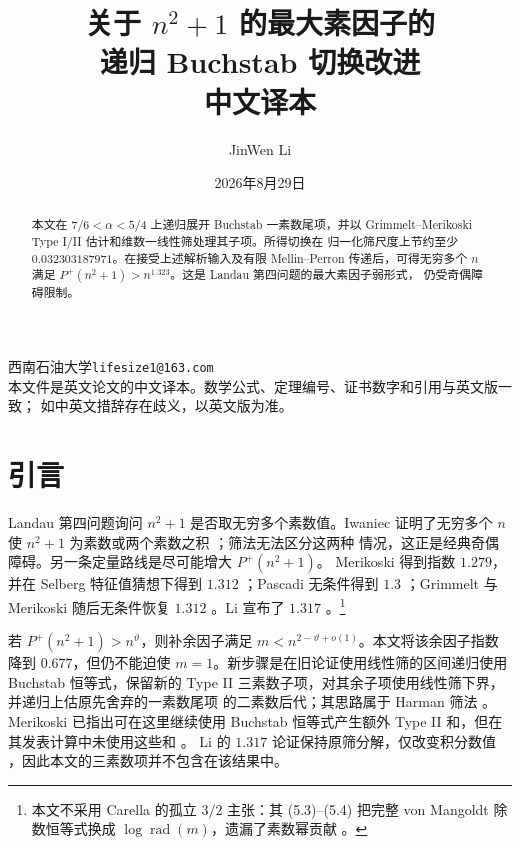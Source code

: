 \documentclass[UTF8,10pt,a4paper]{ctexart}
\title{关于 $n^2+1$ 的最大素因子的\\递归 Buchstab 切换改进\\
\large 中文译本}
\author{JinWen Li}
\date{2026年8月29日}
\newcommand{\Pplus}{P^{+}}
\newcommand{\1}{\mathbf{1}}
\theoremstyle{remark}
\begin{document}
\maketitle

\begin{center}
\small
西南石油大学\quad\texttt{lifesize1@163.com}\\[4pt]
本文件是英文论文的中文译本。数学公式、定理编号、证书数字和引用与英文版一致；
如中英文措辞存在歧义，以英文版为准。
\end{center}

\begin{abstract}
本文在 $7/6<\alpha<5/4$ 上递归展开 Buchstab 一素数尾项，并以
Grimmelt--Merikoski Type I/II 估计和维数一线性筛处理其子项。所得切换在
归一化筛尺度上节约至少 $0.032303187971$。在接受上述解析输入及有限
Mellin--Perron 传递后，可得无穷多个 $n$ 满足
$\Pplus(n^2+1)>n^{1.323}$。这是 Landau 第四问题的最大素因子弱形式，
仍受奇偶障碍限制。
\end{abstract}


\section{引言}

Landau 第四问题询问 $n^2+1$ 是否取无穷多个素数值。Iwaniec 证明了无穷多个
$n$ 使 $n^2+1$ 为素数或两个素数之积 \cite{Iwaniec1978}；筛法无法区分这两种
情况，这正是经典奇偶障碍。另一条定量路线是尽可能增大 $\Pplus(n^2+1)$。
Merikoski 得到指数 $1.279$，并在 Selberg 特征值猜想下得到 $1.312$
\cite{Merikoski2020}；Pascadi 无条件得到 $1.3$ \cite{Pascadi2026}；Grimmelt 与
Merikoski 随后无条件恢复 $1.312$ \cite{GrimmeltMerikoski2025}。Li 宣布了
$1.317$ \cite{Li2025}。\footnote{本文不采用 Carella 的孤立 $3/2$ 主张：其
(5.3)--(5.4) 把完整 von Mangoldt 除数恒等式换成
$\log\operatorname{rad}(m)$，遗漏了素数幂贡献 \cite[Section 5]{Carella2025}。}

若 $\Pplus(n^2+1)>n^\vartheta$，则补余因子满足
$m<n^{2-\vartheta+o(1)}$。本文将该余因子指数降到 $0.677$，但仍不能迫使
$m=1$。新步骤是在旧论证使用线性筛的区间递归使用 Buchstab 恒等式，保留新的
Type II 三素数子项，对其余子项使用线性筛下界，并递归上估原先舍弃的一素数尾项
的二素数后代；其思路属于 Harman 筛法 \cite{Harman2007}。Merikoski 已指出可在这里继续使用 Buchstab 恒等式产生额外
Type II 和，但在其发表计算中未使用这些和 \cite[Remark 12]{Merikoski2020}。
Li 的 $1.317$ 论证保持原筛分解，仅改变积分数值
\cite[Lemmas 2.1 and 2.2]{Li2025}，因此本文的三素数项并不包含在该结果中。
\end{document}
